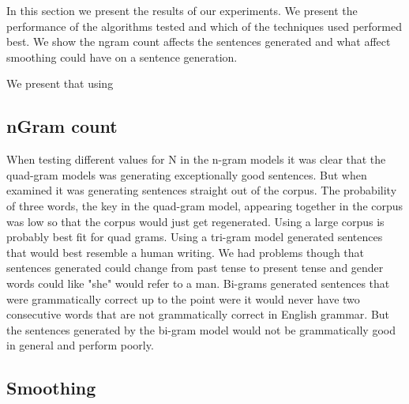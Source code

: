 \documentclass[ai15_group61_report.tex]{subfiles}
\begin{document}
In this section we present the results of our experiments. We present the performance of the algorithms tested and which of the techniques used performed best. We show the ngram count affects the sentences generated and what affect smoothing could have on a sentence generation.

We present that using

\subsection{nGram count}
When testing different values for N in the n-gram models it was clear that the quad-gram models was generating exceptionally good sentences. But when examined it was  generating sentences straight out of the corpus. The probability of three words, the key in the quad-gram model, appearing together in the corpus was low so that the corpus would just get regenerated. Using a large corpus is probably best fit for quad grams. Using a tri-gram model generated sentences that would best resemble a human writing. We had problems though that sentences generated could change from past tense to present tense and gender words could like "she" would refer to a man. Bi-grams generated sentences that were grammatically correct up to the point were it would never have two consecutive words that are not grammatically correct in English grammar. But the sentences generated by the bi-gram model would not be grammatically good in general and perform poorly.
\subsection{Smoothing}
\end{document}
